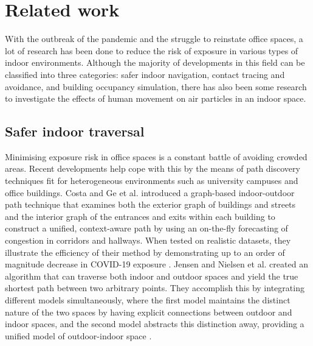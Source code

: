 \documentclass[acmtog]{acmart}
\begin{document}


\section{Related work}
With the outbreak of the pandemic and the struggle to reinstate office spaces, a lot of research has been done to reduce the risk of exposure in various types of indoor environments. Although the majority of developments in this field can be classified into three categories: safer indoor navigation, contact tracing and avoidance, and building occupancy simulation, there has also been some research to investigate the effects of human movement on air particles in an indoor space.

\subsection{Safer indoor traversal}

Minimising exposure risk in office spaces is a constant battle of avoiding crowded areas. Recent developments help cope with this by the means of path discovery techniques fit for heterogeneous environments such as university campuses and office buildings. Costa and Ge et al. introduced a graph-based indoor-outdoor path technique that examines both the exterior graph of buildings and streets and the interior graph of the entrances and exits within each building to construct a unified, context-aware path by using an on-the-fly forecasting of congestion in corridors and hallways. When tested on realistic datasets, they illustrate the efficiency of their method by demonstrating up to an order of magnitude decrease in COVID-19 exposure \cite{costa2019caprio}. Jensen and Nielsen et al. created an algorithm that can traverse both indoor and outdoor spaces and yield the true shortest path between two arbitrary points. They accomplish this by integrating different models simultaneously, where the first model maintains the distinct nature of the two spaces by having explicit connections between outdoor and indoor spaces, and the second model abstracts this distinction away, providing a unified model of outdoor-indoor space \cite{jensen2016outdoor}.
\end{document}
